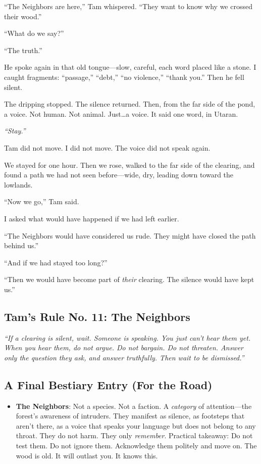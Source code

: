 \documentclass[11pt]{article}
\begin{document}
``The Neighbors are here,'' Tam whispered. ``They want to know why we crossed their wood.''

``What do we say?''

``The truth.''

He spoke again in that old tongue---slow, careful, each word placed like a stone. I caught fragments: ``passage,'' ``debt,'' ``no violence,'' ``thank you.'' Then he fell silent.

The dripping stopped. The silence returned. Then, from the far side of the pond, a voice. Not human. Not animal. Just\dots a voice. It said one word, in Utaran.

\textit{``Stay.''}

Tam did not move. I did not move. The voice did not speak again.

We stayed for one hour. Then we rose, walked to the far side of the clearing, and found a path we had not seen before---wide, dry, leading down toward the lowlands.

``Now we go,'' Tam said.

I asked what would have happened if we had left earlier.

``The Neighbors would have considered us rude. They might have closed the path behind us.''

``And if we had stayed too long?''

``Then we would have become part of \textit{their} clearing. The silence would have kept us.''

\subsection*{Tam's Rule No. 11: The Neighbors}
\textit{``If a clearing is silent, wait. Someone is speaking. You just can't hear them yet. When you hear them, do not argue. Do not bargain. Do not threaten. Answer only the question they ask, and answer truthfully. Then wait to be dismissed.''}

\subsection*{A Final Bestiary Entry (For the Road)}
\begin{itemize}
    \item \textbf{The Neighbors}: Not a species. Not a faction. A \textit{category} of attention---the forest's awareness of intruders. They manifest as silence, as footsteps that aren't there, as a voice that speaks your language but does not belong to any throat. They do not harm. They only \textit{remember}. Practical takeaway: Do not test them. Do not ignore them. Acknowledge them politely and move on. The wood is old. It will outlast you. It knows this.
\end{itemize}
\end{document}
